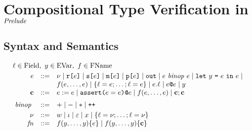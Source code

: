\section{Compositional Type Verification in $\mathit{Prelude}$}

\subsection{Syntax and Semantics}

$$
\begin{array}{rcl}
  \multicolumn{3}{l}{\flab \in \mathrm{Field},\   y \in \mathrm{EVar}, \  f \in \mathrm{FName}}\\[1mm]
  e &::=& \mv \mid \flip{e} \mid \secret{e} \mid \mesg{e} \mid \rvl{e} \mid \outkw \mid e \bop e \mid
  \elet{y}{e}{e} \mid \\
  & & f(e,\ldots,e) \mid \{ \flab = e; \ldots; \flab = e \} \mid e.\flab \mid \elab{e}{e} \mid y\\
  \cmd &::=& %
  \assign{e}{e} \mid \elab{\assert{e = e}}{e} \mid f(e,\ldots,e) \mid  \cmd;\cmd \\[2mm] %
  \bop &::=& \fplus \mid \fminus \mid \ftimes \mid \concat  \\[1mm]%
  \mv &::=& w \mid \cid \mid \be \mid x \mid \{ \flab = \mv;\ldots;\flab = \mv \} 
  \\ %
  \mathit{fn} &::=& f(y,\ldots,y) \{ e \} \mid  f(y,\ldots,y) \{ \cmd \} %
\end{array}
$$

